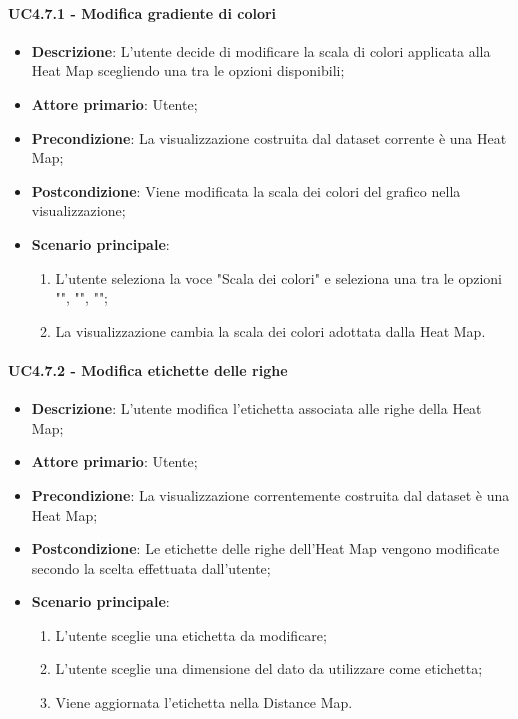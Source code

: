 \paragraph{UC4.7.1 - Modifica gradiente di colori}
\label{par:uc4.7.1}
\begin{itemize}
    \item \textbf{Descrizione}: L'utente decide di modificare la scala di colori applicata alla Heat Map scegliendo una tra le opzioni disponibili;

    \item \textbf{Attore primario}: Utente;

    \item \textbf{Precondizione}:   La visualizzazione costruita dal dataset corrente è una Heat Map;
    \item \textbf{Postcondizione}:  Viene modificata la scala dei colori del grafico nella visualizzazione;

	\item \textbf{Scenario principale}:
        \begin{enumerate}
            \item L'utente seleziona la voce "Scala dei colori" e seleziona una tra le opzioni  "", "", "";
            \item La visualizzazione cambia la scala dei colori adottata dalla Heat Map.
        \end{enumerate}
\end{itemize}

\paragraph{UC4.7.2 - Modifica etichette delle righe}
\label{par:uc4.7.3}
\begin{itemize}
    \item \textbf{Descrizione}:     L'utente modifica l'etichetta associata alle righe della Heat Map;
    \item \textbf{Attore primario}: Utente;
    \item \textbf{Precondizione}:   La visualizzazione correntemente costruita dal dataset è una Heat Map;
    \item \textbf{Postcondizione}:  Le etichette delle righe dell'Heat Map vengono modificate secondo la scelta effettuata dall'utente;
    \item \textbf{Scenario principale}:
    \begin{enumerate}
        \item L'utente sceglie una etichetta da modificare;
        \item L'utente sceglie una dimensione del dato da utilizzare come etichetta;
        \item Viene aggiornata l'etichetta nella Distance Map.
    \end{enumerate}
\end{itemize}

